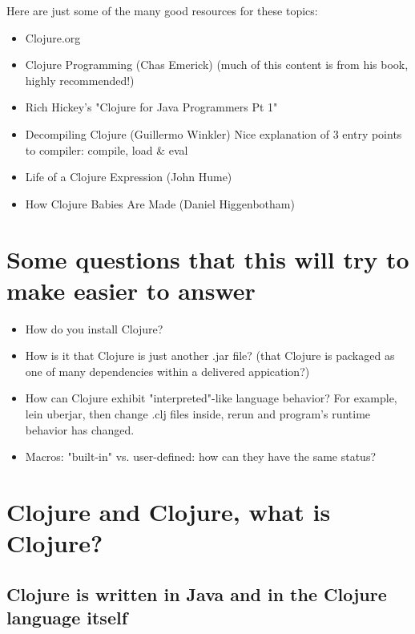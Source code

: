 \documentclass[11pt]{article}
\begin{document}
Here are just some of the many good resources for these topics:

\begin{itemize}
\item Clojure.org
\item Clojure Programming (Chas Emerick)
(much of this content is from his book, highly recommended!)
\item Rich Hickey's "Clojure for Java Programmers Pt 1"
\item Decompiling Clojure (Guillermo Winkler)
Nice explanation of 3 entry points to compiler: compile, load \& eval
\item Life of a Clojure Expression (John Hume)
\item How Clojure Babies Are Made (Daniel Higgenbotham)
\end{itemize}

\section{Some questions that this will try to make easier to answer}
\label{sec:orgheadline3}

\begin{itemize}
\item How do you install Clojure?

\item How is it that Clojure is just another .jar file?
(that Clojure is packaged as one of many dependencies within a delivered appication?)

\item How can Clojure exhibit "interpreted"-like language behavior?
For example, lein uberjar, then change .clj files inside, rerun
and program's runtime behavior has changed.

\item Macros: "built-in" vs. user-defined: how can they have the same status?
\end{itemize}

\section{Clojure and Clojure, what is Clojure?}
\label{sec:orgheadline6}

\subsection{Clojure is written in Java and in the Clojure language itself}
\label{sec:orgheadline4}
\end{document}
